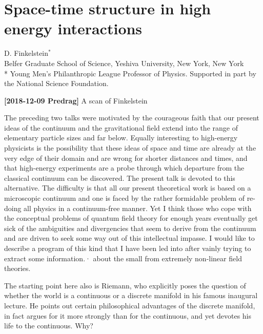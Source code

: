 \newpage
\section{Space-time structure in high energy interactions}
\label{sect:Finkel69a}

\noindent
D. Finkelstein$^*$
\\
Belfer Graduate School
of Science, Yeshiva University, New York, New York
\\{\footnotesize
* Young Men's Philanthropic League Professor of Physics.
  Supported in part by the National Science Foundation.
  }


\medskip

\hfill{\footnotesize
{\bf [2018-12-09 Predrag]} A scan of Finkelstein 
}

\bigskip\bigskip

The preceding two talks were motivated by the courageous faith that our present
ideas of the continuum and the gravitational field extend into the range of
elementary particle sizes and far below. Equally interesting to high-energy
physicists is the possibility that these ideas of space and time are already at
the very edge of their domain and are wrong for shorter distances and times, and
that high-energy experiments are a probe through which departure from the
classical continuum can be discovered. The present talk is devoted to this
alternative. The difficulty is that all our present theoretical work is based on
a microscopic continuum and one is faced by the rather formidable problem of
re-doing all physics in a continuum-free manner. Yet I think those who cope with
the conceptual problems of quantum field theory for enough years eventually get
sick of the ambiguities and divergencies that seem to derive from the continuum
and are driven to seek some way out of this intellectual impasse. I would like to
describe a program of this kind that I have been led into after vainly trying to
extract some information.· about the small from extremely non-linear field
theories.

The starting point here also is Riemann, who explicitly poses the question of
whether the world is a continuous or a discrete manifold in his famous inaugural
lecture. He points out certain philosophical advantages of the discrete manifold,
in fact argues for it more strongly than for the continuous, and yet devotes his
life to the continuous. Why?

